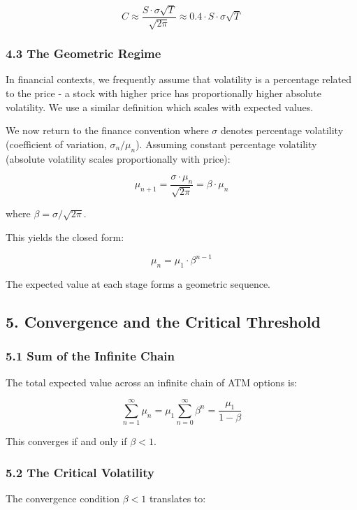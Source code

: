 \documentclass[
  11pt,
  openany]{article}
\begin{document}
\[C \approx \frac{S \cdot \sigma\sqrt{T}}{\sqrt{2\pi}} \approx 0.4 \cdot S \cdot \sigma\sqrt{T}\]

\subsubsection{4.3 The Geometric Regime}\label{the-geometric-regime}

In financial contexts, we frequently assume that volatility is a
percentage related to the price - a stock with higher price has
proportionally higher absolute volatility. We use a similar definition
which scales with expected values.

We now return to the finance convention where \(\sigma\) denotes
percentage volatility (coefficient of variation, \(\sigma_n/\mu_n\)).
Assuming constant percentage volatility (absolute volatility scales
proportionally with price):

\[\mu_{n+1} = \frac{\sigma \cdot \mu_n}{\sqrt{2\pi}} = \beta \cdot \mu_n\]

where \(\beta = \sigma/\sqrt{2\pi}\).

This yields the closed form:

\[\mu_n = \mu_1 \cdot \beta^{n-1}\]

The expected value at each stage forms a geometric sequence.

\subsection{5. Convergence and the Critical
Threshold}\label{convergence-and-the-critical-threshold}

\subsubsection{5.1 Sum of the Infinite
Chain}\label{sum-of-the-infinite-chain}

The total expected value across an infinite chain of ATM options is:

\[\sum_{n=1}^{\infty} \mu_n = \mu_1 \sum_{n=0}^{\infty} \beta^n = \frac{\mu_1}{1-\beta}\]

This converges if and only if \(\beta < 1\).

\subsubsection{5.2 The Critical
Volatility}\label{the-critical-volatility}

The convergence condition \(\beta < 1\) translates to:
\end{document}
